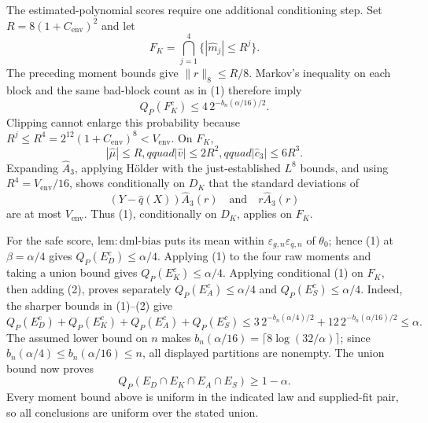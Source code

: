 The estimated-polynomial scores require one additional conditioning step.  Set \(R=8(1+C_{\mathrm{env}})^2\) and let
\[
F_K=\bigcap_{j=1}^4\{|\widehat m_j|\le R^j\}.
\]
The preceding moment bounds give \(\lVert r\rVert_8\le R/8\).  Markov's inequality on each block and the same bad-block count as in (1) therefore imply
\[
Q_P(F_K^c)\le4\,2^{-b_n(\alpha/16)/2}.
\tag{2}
\]
Clipping cannot enlarge this probability because \(R^j\le R^4=2^{12}(1+C_{\mathrm{env}})^8<V_{\mathrm{env}}\).  On \(F_K\),
\[
|\widehat\mu|\le R,qquad
|\widehat v|\le2R^2,qquad
|\widehat c_3|\le6R^3.
\]
Expanding \(\widehat A_3\), applying H\"older with the just-established \(L^8\) bounds, and using \(R^4=V_{\mathrm{env}}/16\), shows conditionally on \(D_K\) that the standard deviations of
\[
(Y-\widehat q(X))\widehat A_3(r)
\quad\text{and}\quad
r\widehat A_3(r)
\]
are at most \(V_{\mathrm{env}}\).  Thus (1), conditionally on \(D_K\), applies on \(F_K\).

For the safe score, \(\mathrm{lem:dml\mbox{-}bias}\) puts its mean within \(\varepsilon_{g,n}\varepsilon_{q,n}\) of \(\theta_0\); hence (1) at \(\beta=\alpha/4\) gives \(Q_P(E_D^c)\le\alpha/4\).  Applying (1) to the four raw moments and taking a union bound gives \(Q_P(E_K^c)\le\alpha/4\).  Applying conditional (1) on \(F_K\), then adding (2), proves separately \(Q_P(E_A^c)\le\alpha/4\) and \(Q_P(E_S^c)\le\alpha/4\).  Indeed, the sharper bounds in (1)--(2) give
\[
Q_P(E_D^c)+Q_P(E_K^c)+Q_P(E_A^c)+Q_P(E_S^c)
\le3\,2^{-b_n(\alpha/4)/2}+12\,2^{-b_n(\alpha/16)/2}
\le\alpha.
\]
The assumed lower bound on \(n\) makes \(b_n(\alpha/16)=\lceil8\log(32/\alpha)\rceil\); since \(b_n(\alpha/4)\le b_n(\alpha/16)\le n\), all displayed partitions are nonempty.  The union bound now proves
\[
Q_P(E_D\cap E_K\cap E_A\cap E_S)\ge1-\alpha.
\]
Every moment bound above is uniform in the indicated law and supplied-fit pair, so all conclusions are uniform over the stated union.

